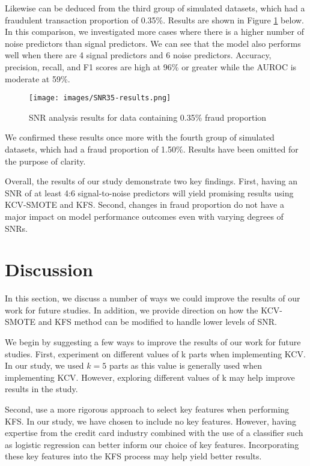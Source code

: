 \documentclass[a4paper, 12pt]{article}
\begin{document}
Likewise can be deduced from the third group of simulated datasets, which had a fraudulent transaction proportion of 0.35\%. Results are shown in Figure \ref{fig:snr35Results} below. In this comparison, we investigated more cases where there is a higher number of noise predictors than signal predictors. We can see that the model also performs well when there are 4 signal predictors and 6 noise predictors. Accuracy, precision, recall, and F1 scores are high at 96\% or greater while the AUROC is moderate at 59\%.

\begin{figure}[H]
\begin{center}
\texttt{[image: images/SNR35-results.png]}
\caption{SNR analysis results for data containing 0.35\% fraud proportion}
\label{fig:snr35Results}
\end{center}
\end{figure}

We confirmed these results once more with the fourth group of simulated datasets, which had a fraud proportion of 1.50\%. Results have been omitted for the purpose of clarity. 

Overall, the results of our study demonstrate two key findings. First, having an SNR of at least 4:6 signal-to-noise predictors will yield promising results using KCV-SMOTE and KFS. Second, changes in fraud proportion do not have a major impact on model performance outcomes even with varying degrees of SNRs.

\section{Discussion}
		
In this section, we discuss a number of ways we could improve the results of our work for future studies. In addition, we provide direction on how the KCV-SMOTE and KFS method can be modified to handle lower levels of SNR.

We begin by suggesting a few ways to improve the results of our work for future studies. First, experiment on different values of k parts when implementing KCV. In our study, we used $k=5$ parts as this value is generally used when implementing KCV. However, exploring different values of k may help improve results in the study.

Second, use a more rigorous approach to select key features when performing KFS. In our study, we have chosen to include no key features. However, having expertise from the credit card industry combined with the use of a classifier such as logistic regression can better inform our choice of key features. Incorporating these key features into the KFS process may help yield better results.
\end{document}
